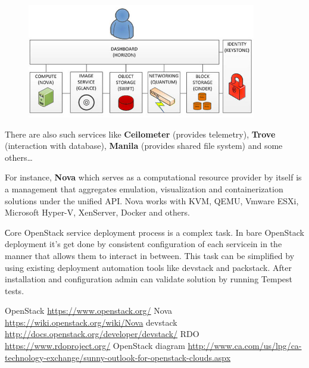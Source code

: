 \documentclass[10pt, a5paper]{article}
\begin{document}
\begin{figure}[h!]
  \centering
  \includegraphics[width=10cm]{19_2016_Perapiolkin1.png}
\end{figure}

There are also such services like \textbf{Ceilometer} (provides telemetry), \textbf{Trove} (interaction with database), \textbf{Manila} (provides shared file \linebreak system) and some others…

For instance, \textbf{Nova} which serves as a computational resource \linebreak provider by itself is a management that aggregates emulation, \linebreak visualization and containerization solutions under the unified API. Nova works with KVM, QEMU, Vmware ESXi, Microsoft Hyper-V, \linebreak XenServer, Docker and others.

Сore OpenStack service deployment process is a complex  task. In bare OpenStack deployment it’s get done by consistent configuration of each servicein in the manner that allows them to interact in between. This task can be simplified by using existing deployment automation tools like devstack and packstack. After installation and configuration admin can validate solution by running Tempest tests.

\begin{thebibliography}{99}
 OpenStack \url{https://www.openstack.org/}
 Nova \url{https://wiki.openstack.org/wiki/Nova}
 devstack \url{http://docs.openstack.org/developer/devstack/}
 RDO \url{https://www.rdoproject.org/}
 OpenStack diagram \url{http://www.ca.com/us/lpg/ca-}\linebreak\url{technology-exchange/sunny-outlook-for-openstack-clouds.aspx}
\end{thebibliography}
\end{document}

